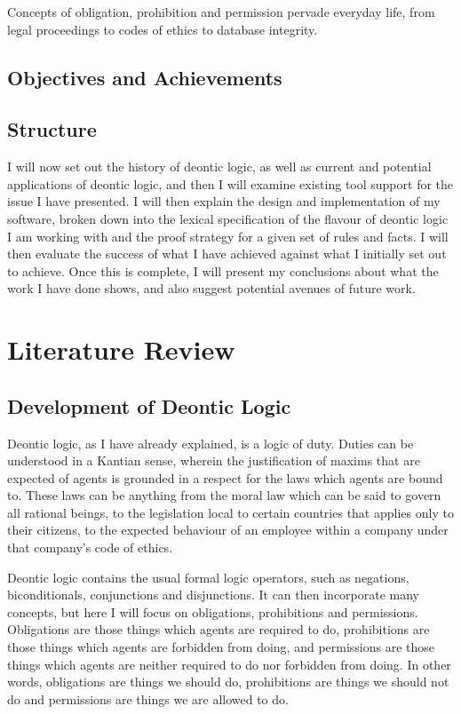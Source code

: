 \documentclass{l4proj}
\begin{document}
Concepts of obligation, prohibition and permission pervade everyday life, from legal proceedings to codes of ethics to database integrity. 


\section{Objectives and Achievements} %

\section{Structure}
I will now set out the history of deontic logic, as well as current and potential applications of deontic logic, and then I will examine existing tool support for the issue I have presented. I will then explain the design and implementation of my software, broken down into the lexical specification of the flavour of deontic logic I am working with and the proof strategy for a given set of rules and facts. I will then evaluate the success of what I have achieved against what I initially set out to achieve. Once this is complete, I will present my conclusions about what the work I have done shows, and also suggest potential avenues of future work. 

\chapter{Literature Review}

\section{Development of Deontic Logic}%
Deontic logic, as I have already explained, is a logic of duty. Duties can be understood in a Kantian sense, wherein the justification of maxims that are expected of agents is grounded in a respect for the laws which agents are bound to\cite{sep-kant-moral}. These laws can be anything from the moral law which can be said to govern all rational beings, to the legislation local to certain countries that applies only to their citizens, to the expected behaviour of an employee within a company under that company's code of ethics. 

Deontic logic contains the usual formal logic operators, such as negations, biconditionals, conjunctions and disjunctions. It can then incorporate many concepts, but here I will focus on obligations, prohibitions and permissions. Obligations are those things which agents are required to do, prohibitions are those things which agents are forbidden from doing, and permissions are those things which agents are neither required to do nor forbidden from doing. In other words, obligations are things we should do, prohibitions are things we should not do and permissions are things we are allowed to do. 
\end{document}
